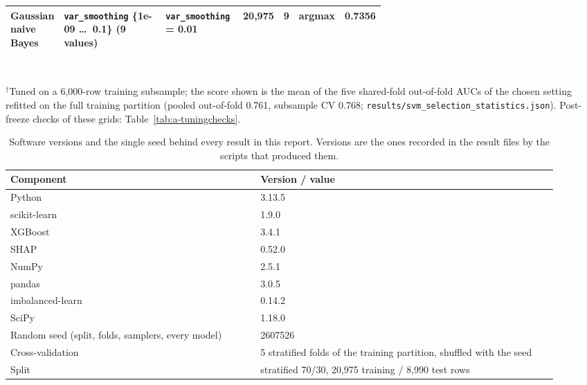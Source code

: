 \begin{table}[!htbp]
\begin{tabular}{@{}L{0.12\linewidth}L{0.30\linewidth}L{0.21\linewidth}cccc@{}}
    Gaussian naive Bayes & \texttt{var\_\allowbreak{}smoothing} \{1e-09 \dots\ 0.1\} (9 values) & \texttt{var\_\allowbreak{}smoothing} = 0.01 & 20,975 & 9 & argmax & 0.7356 \\
    \bottomrule
  \end{tabular}
  \\[3pt]\begin{minipage}{\linewidth}\footnotesize $^{\dagger}$Tuned on a 6,000-row training subsample; the score shown is the mean of the five shared-fold out-of-fold AUCs of the chosen setting refitted on the full training partition (pooled out-of-fold 0.761, subsample CV 0.768; \texttt{results/svm\_selection\_statistics.json}). Post-freeze checks of these grids: Table~\ref{tab:a-tuningchecks}.\end{minipage}
\end{table}

\begin{table}[!htbp]
  \caption{Software versions and the single seed behind every result in this report. Versions are the ones recorded in the result files by the scripts that produced them.}
  \label{tab:a-software}
  \centering
  \small
  \begin{tabular}{@{}L{0.42\linewidth}L{0.50\linewidth}@{}}
    \toprule
    Component & Version / value \\
    \midrule
    Python & 3.13.5 \\
    scikit-learn & 1.9.0 \\
    XGBoost & 3.4.1 \\
    SHAP & 0.52.0 \\
    NumPy & 2.5.1 \\
    pandas & 3.0.5 \\
    imbalanced-learn & 0.14.2 \\
    SciPy & 1.18.0 \\
    Random seed (split, folds, samplers, every model) & 2607526 \\
    Cross-validation & 5 stratified folds of the training partition, shuffled with the seed \\
    Split & stratified 70/30, 20,975 training / 8,990 test rows \\
    \bottomrule
  \end{tabular}
\end{table}
\clearpage

